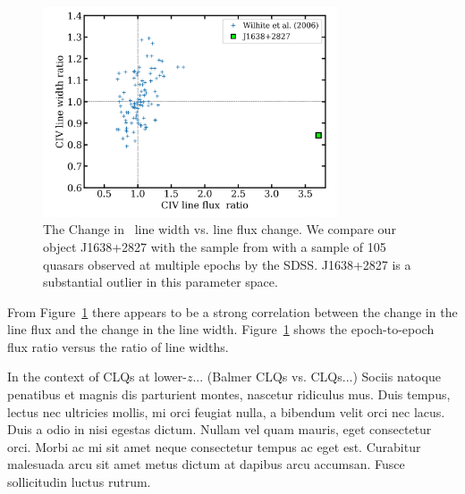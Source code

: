 \documentclass[a4paper,fleqn,usenatbib]{mnras}
\begin{document}
\begin{figure}
  \centering
  \includegraphics[width=8.7cm, trim=0.2cm 0.2cm 0.2cm 0.2cm, clip]
  {figures/Wilhite_2006_Fig2_redux_20190926.png}
   \vspace{-12pt}
  \caption[]{The Change in \civ\ line width vs. line flux change. 
We compare our object J1638+2827 with the sample 
from \citet{Wilhite2006} with a sample of 105 quasars observed at
multiple epochs by the SDSS. J1638+2827 is a substantial outlier 
in this parameter space.}
  \label{fig:Wilhite2006_comparison}
\end{figure}
From Figure~\ref{fig:Wilhite2006_comparison} there appears to be a
strong correlation between the change in the line flux and the change
in the line width.  Figure~\ref{fig:Wilhite2006_comparison} shows the
epoch-to-epoch flux ratio versus the ratio of line widths.

In the context of CLQs at lower-$z$...  
(Balmer CLQs vs. \civ CLQs...) 
Sociis natoque penatibus et
magnis dis parturient montes, nascetur ridiculus mus. Duis tempus,
lectus nec ultricies mollis, mi orci feugiat nulla, a bibendum velit
orci nec lacus. Duis a odio in nisi egestas dictum. Nullam vel quam
mauris, eget consectetur orci. Morbi ac mi sit amet neque consectetur
tempus ac eget est. Curabitur malesuada arcu sit amet metus dictum at
dapibus arcu accumsan. Fusce sollicitudin luctus rutrum.  
\end{document}
